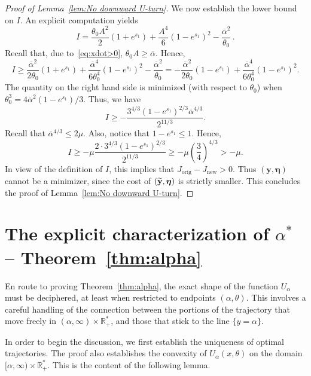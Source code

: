 \documentclass[10pt]{amsart}
\theoremstyle{definition}\newtheorem{defi}[theo]{Definition}\newtheorem{rema}[theo]{Remark}\newtheorem{exam}[theo]{Example}\newtheorem{exem}[theo]{Example}\newtheorem{nota}[theo]{Notation}
\newcommand{\orig}{\mathrm{orig}}
\newcommand{\new}{\mathrm{new}}
\newcommand{\R}{\mathbb{R}}
\newcommand{\by}{\mathbf{y}}
\newcommand{\beeta}{\boldsymbol{\eta}}
\newcommand{\1}{\mathds{1}}
\let\oldtilde\tilde
\renewcommand*{\tilde}[1]{\mathchoice{\widetilde{#1}}{\widetilde{#1}}{\oldtilde{#1}}{\oldtilde{#1}}}
\begin{document}
\begin{proof}[Proof of Lemma~\ref{lem:No downward U-turn}]
We now establish the lower bound on $I$. An explicit computation yields
\begin{equation*}
I = \frac{\theta_0 A^2}2 \left(1+e^{s_1}\right) + \frac{A^4}{6} \left(1 - e^{s_1}\right)^2 - \frac{\overline\alpha^2}{\theta_0}\,.
\end{equation*}
Recall that, due to~\eqref{eq:xdot>0}, $\theta_0 A \geq \overline\alpha$. Hence,
\[
I \geq \frac{\overline\alpha^2}{2\theta_0} \left(1+e^{s_1}\right) + \frac{\overline\alpha^4}{6 \theta_0^4}\left(1 - e^{s_1}\right)^2 - \frac{\overline\alpha^2}{\theta_0} = -\frac{\overline\alpha^2}{2\theta_0}\left(1-e^{s_1}\right) + \frac{\overline\alpha^4}{6 \theta_0^4}\left(1 - e^{s_1}\right)^2.
\]
The quantity on the right hand side is minimized (with respect to $\theta_0$) when $\theta_0^3 = 4\overline\alpha^2(1-e^{s_1})/3$. Thus, we have
\begin{equation*}
I \geq -\frac{3^{4/3}\left(1-e^{s_1}\right)^{2/3}\overline\alpha^{4/3}}{2^{11/3}}.
\end{equation*}
Recall that $\overline\alpha^{4/3}\leq 2\mu$. Also, notice that $1-e^{s_1}\leq 1$. Hence,
\[
I \geq -\mu \frac{2 \cdot 3^{4/3} (1-e^{s_1})^{2/3}}{2^{11/3}}
\geq -\mu \left(\frac{3}{4}\right)^{4/3} > - \mu.
\]
In view of the definition of $I$, this implies that $J_{\orig} - J_{\new} > 0$. Thus $(\by,\beeta)$ cannot be a minimizer, since the cost of $(\tilde \by, \beeta)$ is strictly smaller. This concludes the proof of Lemma~\ref{lem:No downward U-turn}.
\end{proof}



\section{The explicit characterization of \texorpdfstring{$\alpha^*$}{alpha*} -- Theorem~\ref{thm:alpha}}
\label{sec:alpha^*}



En route to proving Theorem~\ref{thm:alpha}, the exact shape of the function $U_\alpha$ must be deciphered, at least when restricted to endpoints $(\alpha,\theta)$. This involves a careful handling of the connection between the portions of the trajectory that move freely in $(\alpha,\infty)\times \R_+^*$, and those that stick to the line $\{y = \alpha\}$.


In order to begin the discussion, we first establish the uniqueness of optimal trajectories. The proof also establishes the convexity of $U_\alpha(x,\theta)$ on the domain $[\alpha,\infty)\times\R_+^*$. This is the content of the following lemma.
\end{document}
